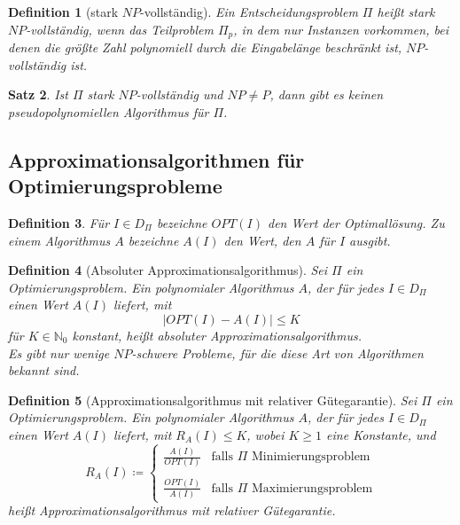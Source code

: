 \documentclass[11pt]{scrartcl}
\theoremstyle{break}
\newtheorem{satz}{Satz}[section]
\newtheorem{defi}[satz]{Definition}
\begin{document}
    \begin{defi}[stark $NP$-vollständig]
        Ein Entscheidungsproblem $\Pi$ heißt stark $NP$-vollständig, wenn das Teilproblem $\Pi_p$, in dem nur Instanzen vorkommen, bei denen die größte Zahl polynomiell durch die Eingabelänge beschränkt ist, $NP$-vollständig ist.
    \end{defi}

    \begin{satz}
        Ist $\Pi$ stark $NP$-vollständig und $NP\neq P$, dann gibt es keinen pseudopolynomiellen Algorithmus für $\Pi$.
    \end{satz}


    \subsection{Approximationsalgorithmen
	 für Optimierungsprobleme}\label{subsec:approximationsalgorithmen-für-optimierungsprobleme}

    \begin{defi}
        Für $I\in D_\Pi$ bezeichne $OPT(I)$ den Wert der Optimallösung.
        Zu einem Algorithmus $A$ bezeichne $A(I)$ den Wert, den $A$ für $I$ ausgibt.
    \end{defi}

    \begin{defi}[Absoluter Approximationsalgorithmus]
        Sei $\Pi$ ein Optimierungsproblem.
        Ein polynomialer Algorithmus $A$, der für jedes $I\in D_\Pi$ einen Wert $A(I)$ liefert, mit
        \[|OPT(I)-A(I)|\leq K\]
        für $K\in\mathbb{N}_0$ konstant, heißt absoluter Approximationsalgorithmus.\\
        Es gibt nur wenige $NP$-schwere Probleme, für die diese Art von Algorithmen bekannt sind.
    \end{defi}

    \begin{defi}[Approximationsalgorithmus mit relativer Gütegarantie]
        Sei $\Pi$ ein Optimierungsproblem.
        Ein polynomialer Algorithmus $A$, der für jedes $I\in D_\Pi$ einen Wert $A(I)$ liefert, mit $R_A(I)\leq K$, wobei $K\geq 1$ eine Konstante, und
        \[R_A(I)\coloneqq
        \begin{cases}
            \frac{A(I)}{OPT(I)} & \text{falls $\Pi$ Minimierungsproblem}\\
            & \\
            \frac{OPT(I)}{A(I)} & \text{falls $\Pi$ Maximierungsproblem}
        \end{cases}
        \]
        heißt Approximationsalgorithmus mit relativer Gütegarantie.
    \end{defi}
\end{document}
